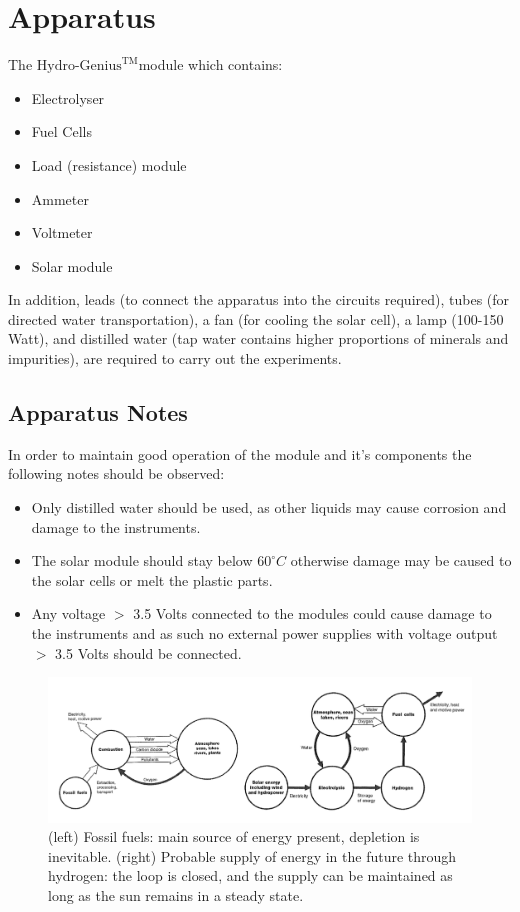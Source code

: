 \documentclass{article}
\begin{document}
    \section{Apparatus}
    The \(\text{Hydro-Genius}^{\text{TM}}\)module which contains:
    \begin{itemize}
        \item Electrolyser
        \item Fuel Cells
        \item Load (resistance) module
        \item Ammeter
        \item Voltmeter
        \item Solar module
    \end{itemize}
    In addition, leads (to connect the apparatus into the circuits required), tubes (for directed water transportation), 
    a fan (for cooling the solar cell), a lamp (100-150 Watt), and distilled water (tap water contains higher proportions of minerals 
    and impurities), are required to carry out the experiments.
    \subsection{Apparatus Notes}
    In order to maintain good operation of the module and it's components the following notes should be observed:
    \begin{itemize}
        \item Only distilled water should be used, as other liquids may cause corrosion and damage to the instruments.
        \item The solar module should stay below \(60^\circ C\) otherwise damage may be caused to the solar cells or melt the plastic 
        parts.
        \item Any voltage \(>\) 3.5 Volts connected to the modules could cause damage to the instruments and as such no external power supplies 
        with voltage output \(>\) 3.5 Volts should be connected.
    \end{itemize}
    \begin{figure}
        \centering
        \includegraphics[scale=0.25]{./cycle.png}
        \caption{(left) Fossil fuels: main source of energy present, depletion is inevitable. (right) 
        Probable supply of energy in the future through hydrogen: the loop is closed, and the supply can be maintained 
        as long as the sun remains in a steady state. \cite{SCE}}
    \end{figure}
\end{document}
